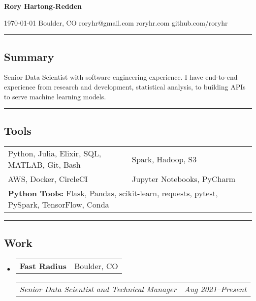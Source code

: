 \documentclass[10pt,letterpaper]{article}
\makeatletter
\newenvironment{indentsection}[1]
{\begin{list}{}%
	{\setlength{\leftmargin}{#1}}
	\item[]%
}
{\end{list}}
\newcommand{\headerrow}[2]{
\begin{tabular*}{\linewidth}{l@{\extracolsep{\fill}}r}
		#1 &
		#2 \\
	\end{tabular*}
}
\newcommand{\jobitem}[4]{\item \headerrow{\textbf{#1}}{#2}
\headerrow{\emph{#3}}{\emph{#4}}}
\makeatother
\begin{document}
{\raggedright \LARGE \bf Rory Hartong-Redden}

{\raggedleft 
\today \/ \textbar
\/ Boulder, CO \textbar
\/ roryhr@gmail.com \textbar
\/ roryhr.com \textbar\/   
github.com/roryhr\\
}
\hrule

\subsection*{Summary}
\begin{centering}  
Senior Data Scientist with software engineering experience. I have end-to-end experience from research and development, statistical analysis, to building APIs to serve machine learning models.\\
\end{centering}
\hrule

\subsection*{Tools}
\begin{indentsection}{\parindent}
\begin{tabular}{p{0.5\linewidth}   p{0.5\linewidth}} 
	Python, Julia, Elixir, SQL, MATLAB, Git, Bash
	& Spark, Hadoop, S3 \\

	AWS, Docker, CircleCI 
	& Jupyter Notebooks, PyCharm\\ 
	
	\multicolumn{2}{l}{
		\textbf{Python Tools:} Flask, Pandas, scikit-learn, requests, pytest, PySpark, TensorFlow, Conda
		}
\end{tabular}
\end{indentsection}

\hrule
\subsection*{Work}

\begin{itemize}
	\jobitem{Fast Radius}{Boulder, CO}
		     {Senior Data Scientist and Technical Manager}{Aug 2021--Present}
\end{itemize}
\end{document}

